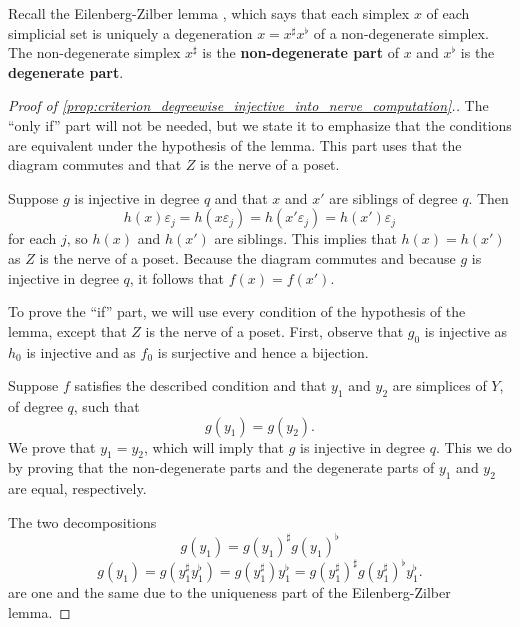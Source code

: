 Recall the Eilenberg-Zilber lemma \cite[Thm.~4.2.3]{FP90}, which says that each simplex $x$ of each simplicial set is uniquely a degeneration $x=x^\sharp x^\flat$ of a non-degenerate simplex. The non-degenerate simplex $x^\sharp$ is the \textbf{non-degenerate part} of $x$ and $x^\flat$ is the \textbf{degenerate part}.
\begin{proof}[Proof of \cref{prop:criterion_degreewise_injective_into_nerve_computation}.]
The ``only if'' part will not be needed, but we state it to emphasize that the conditions are equivalent under the hypothesis of the lemma. This part uses that the diagram commutes and that $Z$ is the nerve of a poset.

Suppose $g$ is injective in degree $q$ and that $x$ and $x'$ are siblings of degree $q$. Then
\[h(x)\varepsilon _j=h(x\varepsilon _j)=h(x'\varepsilon _j)=h(x')\varepsilon _j\]
for each $j$, so $h(x)$ and $h(x')$ are siblings. This implies that $h(x)=h(x')$ as $Z$ is the nerve of a poset. Because the diagram commutes and because $g$ is injective in degree $q$, it follows that $f(x)=f(x')$.

To prove the ``if'' part, we will use every condition of the hypothesis of the lemma, except that $Z$ is the nerve of a poset. First, observe that $g_0$ is injective as $h_0$ is injective and as $f_0$ is surjective and hence a bijection.

Suppose $f$ satisfies the described condition and that $y_1$ and $y_2$ are simplices of $Y$, of degree $q$, such that
\begin{equation}\label{lb:Equation0_criterion_embedded_sieblings}
g(y_1)=g(y_2).
\end{equation}
We prove that $y_1=y_2$, which will imply that $g$ is injective in degree $q$. This we do by proving that the non-degenerate parts and the degenerate parts of $y_1$ and $y_2$ are equal, respectively.

The two decompositions
\begin{displaymath}
g(y_1)=g(y_1)^\sharp g(y_1)^\flat
\end{displaymath}
\begin{displaymath}
g(y_1)=g(y_1^\sharp y_1^\flat )=g(y_1^\sharp )y_1^\flat =g(y_1^\sharp )^\sharp g(y_1^\sharp )^\flat y_1^\flat .
\end{displaymath}
are one and the same due to the uniqueness part of the Eilenberg-Zilber lemma.


\end{proof}
